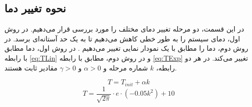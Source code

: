 \documentclass[11.5pt,a4paper]{article}
\begin{document}
\subsection{نحوه تغییر دما}
در این قسمت، دو مرحله تغییر دمای مختلف را مورد بررسی قرار می‌دهیم. در روش اول، دمای سیستم را به طور خطی کاهش می‌دهیم تا به یک حد آستانه‌ای برسد. در روش دوم، دما را مطابق با یک نمودار نمایی تغییر می‌دهیم .
در روش اول، دما مطابق با رابطه 
\ref{eq:TLin}
و در روش دوم،‌ مطابق با رابطه
\ref{eq:TExp} 
تغییر می‌کند. در هر دو رابطه، $k$ شماره مرحله و $\alpha > 0$ و $\gamma > 0$ مقادیر ثابت هستند.

\begin{equation}
\label{eq:TLin}
T = T_{init} + \alpha k
\end{equation}
\begin{equation}
\label{eq:TExp}
T = \frac{1}{\sqrt{2\pi}} \cdot e \cdot (-0.05 k^2) + 10
\end{equation}
\end{document}
